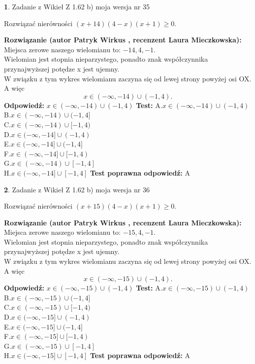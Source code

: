 \documentclass[12pt, a4paper]{article}
\theoremstyle{definition} %
\newtheorem{zad}{}
\newcommand{\zadStart}[1]{\begin{zad}#1\newline}
\newcommand{\zadStop}{\end{zad}}
\newcommand{\rozwStart}[2]{\noindent \textbf{Rozwiązanie (autor #1 , recenzent #2): }\newline}
\newcommand{\rozwStop}{\newline}
\newcommand{\odpStart}{\noindent \textbf{Odpowiedź:}\newline}
\newcommand{\odpStop}{\newline}
\newcommand{\testStart}{\noindent \textbf{Test:}\newline}
\newcommand{\testStop}{\newline}
\newcommand{\kluczStart}{\noindent \textbf{Test poprawna odpowiedź:}\newline}
\newcommand{\kluczStop}{\newline}
\begin{document}
\zadStart{Zadanie z Wikieł Z 1.62 b) moja wersja nr 35}

Rozwiązać nierówności $(x+14)(4-x)(x+1)\ge0$.
\zadStop
\rozwStart{Patryk Wirkus}{Laura Mieczkowska}
Miejsca zerowe naszego wielomianu to: $-14, 4, -1$.\\
Wielomian jest stopnia nieparzystego, ponadto znak współczynnika przy\linebreak najwyższej potędze x jest ujemny.\\ W związku z tym wykres wielomianu zaczyna się od lewej strony powyżej osi OX. A więc $$x \in (-\infty,-14) \cup (-1,4).$$
\rozwStop
\odpStart
$x \in (-\infty,-14) \cup (-1,4)$
\odpStop
\testStart
A.$x \in (-\infty,-14) \cup (-1,4)$\\
B.$x \in (-\infty,-14) \cup (-1,4]$\\
C.$x \in (-\infty,-14) \cup [-1,4)$\\
D.$x \in (-\infty,-14] \cup (-1,4)$\\
E.$x \in (-\infty,-14] \cup (-1,4]$\\
F.$x \in (-\infty,-14] \cup [-1,4)$\\
G.$x \in (-\infty,-14) \cup [-1,4]$\\
H.$x \in (-\infty,-14] \cup [-1,4]$
\testStop
\kluczStart
A
\kluczStop



\zadStart{Zadanie z Wikieł Z 1.62 b) moja wersja nr 36}

Rozwiązać nierówności $(x+15)(4-x)(x+1)\ge0$.
\zadStop
\rozwStart{Patryk Wirkus}{Laura Mieczkowska}
Miejsca zerowe naszego wielomianu to: $-15, 4, -1$.\\
Wielomian jest stopnia nieparzystego, ponadto znak współczynnika przy\linebreak najwyższej potędze x jest ujemny.\\ W związku z tym wykres wielomianu zaczyna się od lewej strony powyżej osi OX. A więc $$x \in (-\infty,-15) \cup (-1,4).$$
\rozwStop
\odpStart
$x \in (-\infty,-15) \cup (-1,4)$
\odpStop
\testStart
A.$x \in (-\infty,-15) \cup (-1,4)$\\
B.$x \in (-\infty,-15) \cup (-1,4]$\\
C.$x \in (-\infty,-15) \cup [-1,4)$\\
D.$x \in (-\infty,-15] \cup (-1,4)$\\
E.$x \in (-\infty,-15] \cup (-1,4]$\\
F.$x \in (-\infty,-15] \cup [-1,4)$\\
G.$x \in (-\infty,-15) \cup [-1,4]$\\
H.$x \in (-\infty,-15] \cup [-1,4]$
\testStop
\kluczStart
A
\kluczStop
\end{document}
